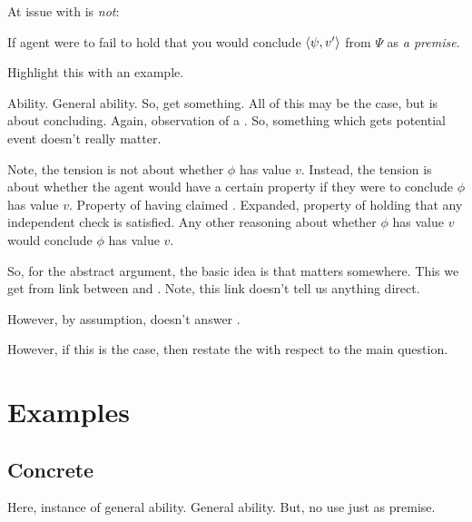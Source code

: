\begin{note}
  At issue with \qzS{} is \emph{not}:

  If agent were to fail to hold that you would conclude \(\langle \psi, v' \rangle\) from \(\Psi\) as \emph{a premise}.
\end{note}

\begin{note}
  Highlight this with an example.

  Ability.
  General ability.
  So, get something.
  All of this may be the case, but \requ{} is about concluding.
  Again, observation of a \deadEnd{}.
  So, something which gets potential event doesn't really matter.
\end{note}

\begin{note}
  Note, the tension is not about whether \(\phi\) has value \(v\).
  Instead, the tension is about whether the agent would have a certain property if they were to conclude \(\phi\) has value \(v\).
  Property of having claimed \support{}.
  Expanded, property of holding that any independent check is satisfied.
  Any other reasoning about whether \(\phi\) has value \(v\) would conclude \(\phi\) has value \(v\).
\end{note}

\begin{note}
  So, for the abstract argument, the basic idea is that \fc{} matters somewhere.
  This we get from link between \qzS{} and \qWhy{}.
  Note, this link doesn't tell us anything direct.

  However, by assumption, doesn't answer \qWhy{}.

  However, if this is the case, then restate the \requ{} with respect to the main question.
\end{note}

\section{Examples}
\label{sec:examples}

\subsection{Concrete}
\label{sec:concrete}

\begin{note}
  Here, instance of general ability.
  General ability.
  But, no use just as premise.
\end{note}

